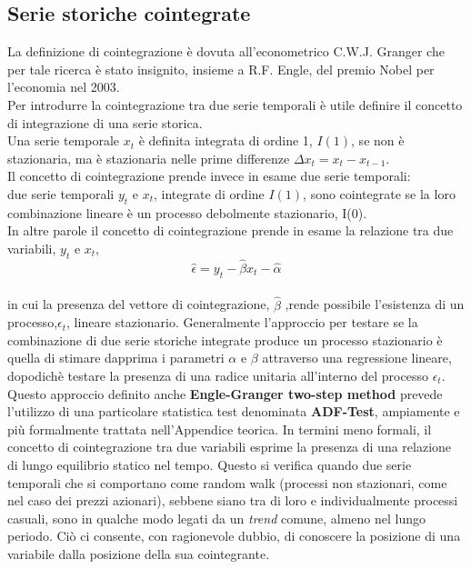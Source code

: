 \documentclass[]{article}
\begin{document}
\subsection{Serie storiche cointegrate}
La definizione di cointegrazione è dovuta all’econometrico C.W.J. Granger che per tale ricerca è stato insignito, insieme a R.F. Engle, del premio Nobel per l’economia nel 2003.
\\
Per introdurre la cointegrazione tra due serie temporali è utile definire il concetto di integrazione di una serie storica.
\\
Una serie temporale $x_t$ è definita integrata di ordine 1, $I(1)$, se non è stazionaria, ma è stazionaria nelle prime differenze $\Delta x_t= x_t - x_{t-1}$.
\\
Il concetto di cointegrazione prende invece in esame due serie temporali: \\ due serie temporali $y_t$ e $x_t$, integrate di ordine $I(1)$, sono cointegrate se la loro combinazione lineare è un processo debolmente stazionario, I(0).
\\
In altre parole il concetto di cointegrazione prende in esame la relazione tra due variabili, $y_t$ e $x_t$,
\begin{equation} 
	\hat{\epsilon} = y_t - \hat{\beta}x_t - \hat{\alpha}
\end{equation}
\\
in cui la presenza del vettore di cointegrazione, $\hat{\beta}$ ,rende possibile l'esistenza di un processo,$\epsilon_t$, lineare stazionario.
Generalmente l'approccio per testare se la combinazione di due serie storiche integrate produce un processo stazionario è quella di stimare dapprima i parametri $\alpha$ e $\beta$ attraverso una regressione lineare, dopodichè testare la presenza di una radice unitaria all'interno del processo $\epsilon_t$. Questo approccio definito anche \textbf{Engle-Granger two-step method} prevede l'utilizzo di una particolare statistica test denominata \textbf{ADF-Test}, ampiamente e più formalmente trattata nell'Appendice teorica.
In termini meno formali, il concetto di cointegrazione tra due variabili esprime la presenza di una relazione di lungo equilibrio statico nel tempo. Questo si verifica quando due serie temporali che si comportano come random walk (processi non stazionari, come nel caso dei prezzi azionari), sebbene siano tra di loro e individualmente processi casuali, sono in qualche modo legati da un \textit{trend} comune, almeno nel lungo periodo. Ciò ci consente, con ragionevole dubbio, di conoscere la posizione di una variabile dalla posizione della sua cointegrante.
\end{document}

